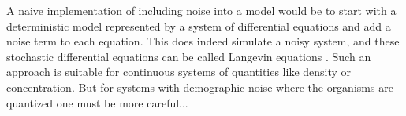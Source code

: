 \iffalse
A naive implementation of including noise into a model would be to start with a deterministic model represented by a system of differential equations and add a noise term to each equation. 
This does indeed simulate a noisy system, and these stochastic differential equations can be called Langevin equations \cite{Nisbet1982,Gardiner2004a}. 
Such an approach is suitable for continuous systems of quantities like density or concentration. 
But for systems with demographic noise where the organisms are quantized one must be more careful...

